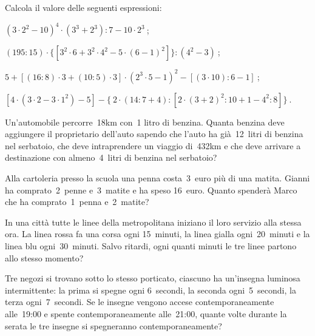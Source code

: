 \begin{esercizio}[\Ast]
 Calcola il valore delle seguenti espressioni:
 \begin{enumeratea}
 \item $(3\cdot2^2-10)^4\cdot(3^3+2^3):7-10\cdot2^3~$;
 \item $(195:15)\cdot\lbrace [3^2\cdot6+3^2\cdot4^2-5\cdot(6-1)^2 ]\rbrace:(4^2-3)~$;
 \item $5+[(16:8)\cdot3+(10:5)\cdot3 ]\cdot(2^3\cdot5-1)^2-[(3\cdot10):6-1]~$;
 \item $[4\cdot(3\cdot2-3\cdot1^2)-5]-\lbrace~2\cdot(14:7+4):[2\cdot(3+2)^2:10+1-4^2:8]\rbrace~$.
 \end{enumeratea}
\end{esercizio}
\begin{multicols}{2}
 \begin{esercizio}[\Ast]
 Un'automobile percorre~18{\unit km} con~1 litro di benzina. Quanta benzina deve aggiungere il proprietario dell'auto
sapendo che l'auto ha già~12~litri di benzina nel serbatoio, che deve intraprendere un viaggio di~432{\unit km} e che deve
arrivare a destinazione con almeno~4~litri di benzina nel serbatoio?
\end{esercizio}

\begin{esercizio}[\Ast]
Alla cartoleria presso la scuola una penna costa~3~euro più di una matita. Gianni ha comprato~2~penne e~3~matite e ha speso
16~euro. Quanto spenderà Marco che ha comprato~1~penna e~2~matite?
\end{esercizio}

\begin{esercizio}[\Ast]
 In una città tutte le linee della metropolitana iniziano il loro servizio alla stessa ora. La linea rossa fa una corsa ogni
15~minuti, la linea gialla ogni~20~minuti e la linea blu ogni~30~minuti. Salvo ritardi, ogni quanti minuti le tre linee
partono allo stesso momento?
\end{esercizio}

\begin{esercizio}
 Tre negozi si trovano sotto lo stesso porticato, ciascuno ha un'insegna luminosa intermittente: la prima si spegne ogni
6~secondi, la seconda ogni~5~secondi, la terza ogni~7~secondi. Se le insegne vengono accese contemporaneamente
alle~19:00 e spente contemporaneamente alle~21:00, quante volte durante la serata le tre insegne
si spegneranno contemporaneamente?
\end{esercizio}


\end{multicols}
